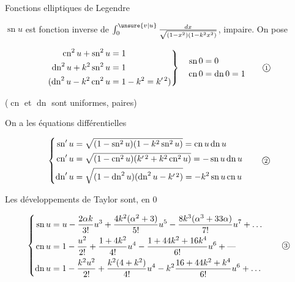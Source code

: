 \begin{center}Fonctions elliptiques de Legendre\end{center}

$\operatorname{sn}u$ est fonction inverse de $\int_0^{\unsure{v|u}}\frac{dx}{\sqrt{(1-x^2)(1-k^2x^2)}}$, impaire. On pose

\[
\left.\begin{aligned}
\operatorname{cn}^2u+\operatorname{sn}^2u&=1\\
\operatorname{dn}^2u+k^2\operatorname{sn}^2u&=1\\
(\operatorname{dn}^2u-k^2\operatorname{cn}^2u&=1-k^2=k'^{\,2})
\end{aligned}\right\}
\quad\begin{aligned}\operatorname{sn}0&=0\\\operatorname{cn}0&=\operatorname{dn}0=1\end{aligned}
\tag*{\textcircled{\scriptsize 1}}
\]

($\operatorname{cn}$ et $\operatorname{dn}$ sont uniformes, paires)

On a les équations différentielles

\[
\left\{\begin{aligned}
\operatorname{sn}'u&=\sqrt{(1-\operatorname{sn}^2u)(1-k^2\operatorname{sn}^2u)}=\operatorname{cn}u\operatorname{dn}u\\
\operatorname{cn}'u&=\sqrt{(1-\operatorname{cn}^2u)(k'^{\,2}+k^2\operatorname{cn}^2u)}=-\operatorname{sn}u\operatorname{dn}u\\
\operatorname{dn}'u&=\sqrt{(1-\operatorname{dn}^2u)(\operatorname{dn}^2u-k'^{\,2})}=-k^2\operatorname{sn}u\operatorname{cn}u
\end{aligned}\right.
\tag*{\textcircled{\scriptsize 2}}
\]

Les développements de Taylor sont, en $0$

\[
\left\{\begin{aligned}
\operatorname{sn}u&=u-\frac{2\alpha k}{3!}u^3+\frac{4k^2(\alpha^2+3)}{5!}u^5-\frac{8k^3(\alpha^3+33\alpha)}{7!}u^7+\ldots\\
\operatorname{cn}u&=1-\frac{u^2}{2!}+\frac{1+4k^2}{4!}u^4-\frac{1+44k^2+16k^4}{6!}u^6+\text{---}\\
\operatorname{dn}u&=1-\frac{k^2u^2}{2!}+\frac{k^2(4+k^2)}{4!}u^4-k^2\frac{16+44k^2+k^4}{6!}u^6+\ldots
\end{aligned}\right.
\tag*{\textcircled{\scriptsize 3}}
\]

